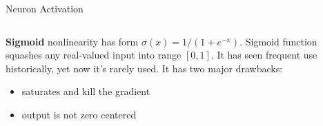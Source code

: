 \documentclass[aspectratio=169]{beamer}
\begin{document}
\begin{frame}{Neuron Activation}
\begin{columns}
\begin{column}{0.7\textwidth}
\textbf{Sigmoid} nonlinearity has form $\sigma(x) = 1 / (1 + e^{-x})$. Sigmoid function squashes any real-valued input into range $[0, 1]$. It has seen frequent use historically, yet now it's rarely used. It has two major drawbacks:
\begin{itemize}
\item saturates and kill the gradient
\item output is not zero centered
\end{itemize}
\end{column}
\end{columns}
\end{frame}

\end{document}
